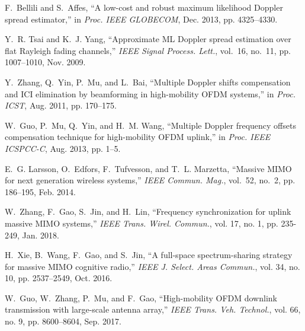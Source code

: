 \documentclass[12pt, draftclsnofoot, onecolumn]{IEEEtran}
\begin{document}
\begin{thebibliography}{99}
F.~Bellili and S.~Affes, ``A low-cost and robust maximum likelihood Doppler spread estimator,'' in \emph{Proc. IEEE GLOBECOM}, Dec. 2013, pp. 4325--4330.

Y.~R. Tsai and K.~J. Yang, ``Approximate ML Doppler spread estimation over
flat Rayleigh fading channels,'' \emph{IEEE Signal Process. Lett.}, vol.~16, no.~11, pp. 1007--1010, Nov. 2009.

Y.~Zhang, Q.~Yin, P.~Mu, and L.~Bai, ``Multiple Doppler shifts compensation
and ICI elimination by beamforming in high-mobility OFDM systems,'' in \emph{Proc. ICST}, Aug. 2011, pp. 170--175.

W.~Guo, P.~Mu, Q.~Yin, and H.~M. Wang, ``Multiple Doppler frequency offsets
compensation technique for high-mobility OFDM uplink,'' in \emph{Proc. IEEE
ICSPCC-C}, Aug. 2013, pp. 1--5.
%

E.~G. Larsson, O.~Edfors, F.~Tufvesson, and T.~L. Marzetta, ``Massive MIMO
for next generation wireless systems,'' \emph{IEEE Commun. Mag.}, vol.~52, no.~2, pp. 186--195, Feb. 2014.

W.~Zhang, F.~Gao, S.~Jin, and H.~Lin, ``Frequency synchronization for uplink massive MIMO systems,'' \emph{IEEE Trans. Wirel. Commun.}, vol. 17, no. 1, pp. 235-249, Jan. 2018.

%

H.~Xie, B.~Wang, F.~Gao, and S.~Jin, ``A full-space spectrum-sharing strategy for massive MIMO cognitive radio,'' \emph{IEEE J. Select. Areas Commun.}, vol. 34, no. 10, pp. 2537--2549, Oct. 2016.

W.~Guo, W.~Zhang, P.~Mu, and F.~Gao, ``High-mobility OFDM downlink transmission with large-scale antenna array,''  \emph{IEEE Trans. Veh. Technol.}, vol. 66, no. 9, pp. 8600--8604, Sep. 2017.


\end{thebibliography}
\end{document}
